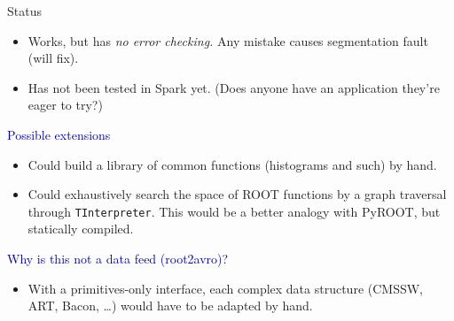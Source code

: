 \documentclass{beamer}
\begin{document}
\begin{frame}{Status}
\begin{itemize}
\item Works, but has {\it no error checking.} Any mistake causes segmentation fault (will fix).
\item Has not been tested in Spark yet. (Does anyone have an application they're eager to try?)
\end{itemize}

\vfill
\vfill
\hspace{-0.83 cm} \textcolor{darkblue}{\Large Possible extensions}
\begin{itemize}
\item Could build a library of common functions (histograms and such) by hand.
\item Could exhaustively search the space of ROOT functions by a graph traversal through {\tt TInterpreter}. This would be a better analogy with PyROOT, but statically compiled.
\end{itemize}

\vfill
\vfill
\hspace{-0.83 cm} \textcolor{darkblue}{\Large Why is this not a data feed (root2avro)?}
\begin{itemize}
\item With a primitives-only interface, each complex data structure (CMSSW, ART, Bacon, \ldots) would have to be adapted by hand.
\end{itemize}
\end{frame}
\end{document}

